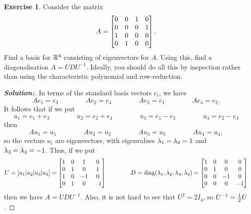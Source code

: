 \documentclass[a4paper]{amsart}
\theoremstyle{definition}
\newtheorem{exercise}{Exercise}
\newenvironment{solution}{\begin{proof}[\textbf{Solution:}] \vphantom{u}}{\end{proof}}
\begin{document}
\begin{exercise}\label{ex-diagonal-iv}
 Consider the matrix
 \[ A = \left[\begin{matrix} 0&0&1&0 \\
             0&0&0&1 \\
             1&0&0&0 \\
             0&1&0&0 \end{matrix}\right].
 \]
 Find a basis for ${\mathbb{R}}^4$ consisting of eigenvectors for $A$.  Using
 this, find a diagonalisation $A=UDU^{-1}$.  Ideally, you should do
 all this by inspection rather than using the characteristic
 polynomial and row-reduction.
\end{exercise}
\begin{solution}
 In terms of the standard basis vectors $e_i$, we have
 \[ Ae_1 = e_3 \hspace{4em}
    Ae_2 = e_4 \hspace{4em}
    Ae_3 = e_1 \hspace{4em}
    Ae_4 = e_2. 
 \]
 It follows that if we put 
 \[ u_1 = e_1+e_3 \hspace{4em}
    u_2 = e_2+e_4 \hspace{4em}
    u_3 = e_1-e_3 \hspace{4em}
    u_4 = e_2-e_4 
 \]
 then
 \[ Au_1 = u_1 \hspace{4em}
    Au_2 = u_2 \hspace{4em}
    Au_3 = u_3 \hspace{4em}
    Au_4 = u_4,
 \]
 so the vectors $u_i$ are eigenvectors, with eigenvalues
 $\lambda_1=\lambda_2=1$ and $\lambda_3=\lambda_4=-1$.  Thus, if we put 
 \[ U = [u_1|u_2|u_3|u_4] 
      = \left[\begin{matrix}  1 &  0 &  1 &  0 \\
              0 &  1 &  0 &  1 \\
              1 &  0 & -1 &  0 \\
              0 &  1 &  0 & -1 \end{matrix}\right]
    \hspace{4em}
    D = \operatorname{diag}(\lambda_1,\lambda_2,\lambda_3,\lambda_4) 
      = \left[\begin{matrix}  1 &  0 &  0 &  0 \\
              0 &  1 &  0 &  0 \\
              0 &  0 & -1 &  0 \\
              0 &  0 &  0 & -1 \end{matrix}\right]
 \]  
 then we have $A=UDU^{-1}$.  Also, it is not hard to see that
 $U^2=2I_4$, so $U^{-1}=\tfrac{1}{2} U$.
\end{solution}
\end{document}
